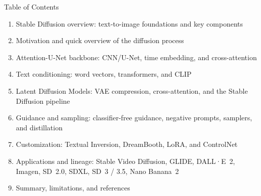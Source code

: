 \begin{frame}{Table of Contents}
  \begin{enumerate}\itemsep0.15em
    \item Stable Diffusion overview: text-to-image foundations and key components
    \item Motivation and quick overview of the diffusion process
    \item Attention-U-Net backbone: CNN/U-Net, time embedding, and cross-attention
    \item Text conditioning: word vectors, transformers, and CLIP
    \item Latent Diffusion Models: VAE compression, cross-attention, and the Stable Diffusion pipeline
    \item Guidance and sampling: classifier-free guidance, negative prompts, samplers, and distillation
    \item Customization: Textual Inversion, DreamBooth, LoRA, and ControlNet
    \item Applications and lineage: Stable Video Diffusion, GLIDE, DALL·E~2, Imagen, SD~2.0, SDXL, SD~3 / 3.5, Nano Banana~2
    \item Summary, limitations, and references
  \end{enumerate}
\end{frame}
